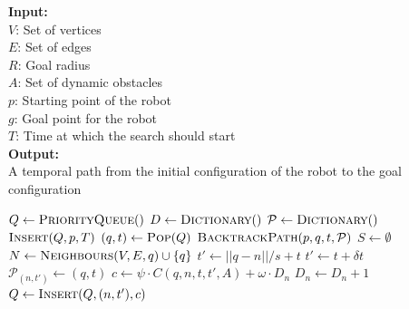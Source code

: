 \documentclass[letterpaper, 10pt, conference]{ieeeconf}
\renewcommand{\algorithmicrequire}{\textbf{Input:}}
\renewcommand{\algorithmicensure}{\textbf{Output:}}
\newcommand{\Acronym}[1]{\ensuremath{{{\texttt{#1}}}}}
\newcommand{\Function}[1]{\ensuremath{{ \textsc{#1}}}}
\begin{document}
\begin{algorithm}[ht]
    \caption{$\Acronym{tBestFS}(V, E, R, A, p, g, T)$}
    \algorithmicrequire{
        \\$V$: Set of vertices
        \\$E$: Set of edges
        \\$R$: Goal radius
        \\$A$: Set of dynamic obstacles
        \\$p$: Starting point of the robot
        \\$g$: Goal point for the robot
        \\$T$: Time at which the search should start
    }
    \\\algorithmicensure{
        \\A temporal path from the initial configuration of the robot
        to the goal configuration
    }

    \label{algo:search}
    \begin{algorithmic}[1]
        \setcounter{ALC@line}{0}
        \vspace*{1mm}
        \STATE $Q \leftarrow \Function{PriorityQueue}()$
        \STATE $D \leftarrow \Function{Dictionary}()$
        \STATE $\mathcal{P} \leftarrow \Function{Dictionary}()$
        \STATE $\Function{Insert}(Q, p, T)$
            \STATE $(q, t) \leftarrow \Function{Pop}(Q)$
                \RETURN $\Function{BacktrackPath}(p, q, t, \mathcal{P})$
            \ENDIF
            \STATE $S \leftarrow \emptyset$
            \STATE $N \leftarrow \Function{Neighbours}(V, E, q) \cup \{q\}$
                    \STATE $t' \leftarrow ||q - n|| / s + t$
                \ELSE
                    \STATE $t' \leftarrow t + \delta t$
                \ENDIF
                \STATE $\mathcal{P}_{(n, t')} \leftarrow (q, t)$
                \STATE $c \leftarrow \psi \cdot C(q, n, t, t', A) + \omega
                    \cdot D_{n}$
                \STATE $D_{n} \leftarrow D_{n} + 1$
                \STATE $Q \leftarrow \Function{Insert}(Q, (n, t'), c)$
            \ENDFOR
        \ENDWHILE
    \end{algorithmic}
\end{algorithm}
\end{document}

